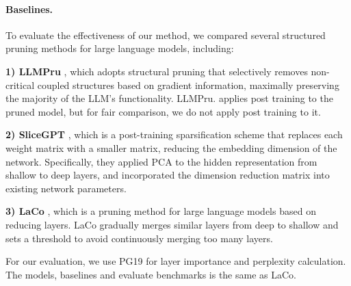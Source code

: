 		\paragraph{Baselines.} 
		
		To evaluate the effectiveness of our method, we compared several structured pruning methods for large language models, including:
		
		\textbf{1) LLMPru} \citep{ma2024llm}, which  adopts structural pruning that selectively removes non-critical coupled structures based on gradient information, maximally preserving the majority of the LLM’s functionality. LLMPru. applies post training to the pruned model, but for fair comparison, we do not apply post training to it.
		
		\textbf{2) SliceGPT} \citep{ashkboos2024slicegpt}, which is a post-training sparsification scheme that replaces each weight matrix with a smaller matrix, reducing the embedding dimension of the network. Specifically, they applied PCA to the hidden representation from shallow to deep layers, and incorporated the dimension reduction matrix into existing network parameters.
		
		\textbf{3) LaCo} \citep{yang2024laco}, which is a pruning method for large language models based on reducing layers. LaCo gradually merges similar layers from deep to shallow and sets a threshold to avoid continuously merging too many layers.
		
		For our evaluation, we use PG19 for layer importance and perplexity calculation. The models, baselines and evaluate benchmarks is the same as LaCo. 
		
